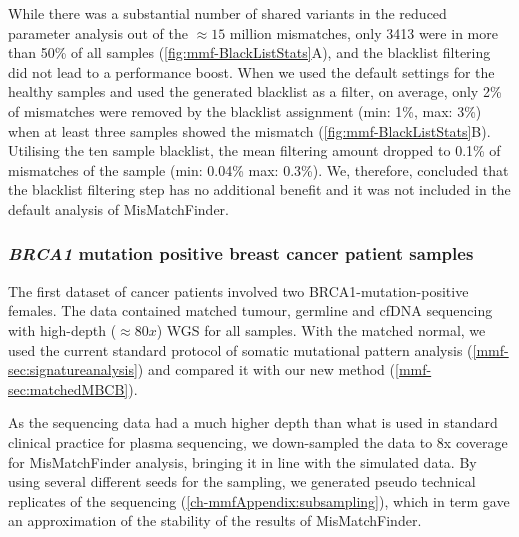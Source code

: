 While there was a substantial number of shared variants in the reduced parameter analysis out of the $\approx 15$ million mismatches, only 3413 were in more than 50\% of all samples (\autoref{fig:mmf-BlackListStats}A), and the blacklist filtering  did not lead to a performance boost. When we used the default settings for the healthy samples and used the generated blacklist as a filter, on average, only 2\% of mismatches were removed by the blacklist assignment (min: 1\%, max: 3\%) when at least three samples showed the mismatch (\autoref{fig:mmf-BlackListStats}B). Utilising the ten sample blacklist, the mean filtering amount dropped to 0.1\% of mismatches of the sample (min: 0.04\% max: 0.3\%). We, therefore, concluded that the blacklist filtering step has no additional benefit and it was not included in the default analysis of MisMatchFinder. 

\subsubsection{\textit{BRCA1} mutation positive breast cancer patient samples}
\label{mmf-sec:brcapatients}
The first dataset of cancer patients involved two BRCA1-mutation-positive females. The data contained matched tumour, germline and cfDNA sequencing with high-depth ($\approx 80x$) WGS for all samples. With the matched normal, we used the current standard protocol of somatic mutational pattern analysis (\autoref{mmf-sec:signatureanalysis}) and compared it with our new method (\autoref{mmf-sec:matchedMBCB}). 

As the sequencing data had a much higher depth than what is used in standard clinical practice for plasma sequencing, we down-sampled the data to 8x coverage for MisMatchFinder analysis, bringing it in line with the simulated data. By using several different seeds for the sampling, we generated pseudo technical replicates of the sequencing (\autoref{ch-mmfAppendix:subsampling}), which in term gave an approximation of the stability of the results of MisMatchFinder.


